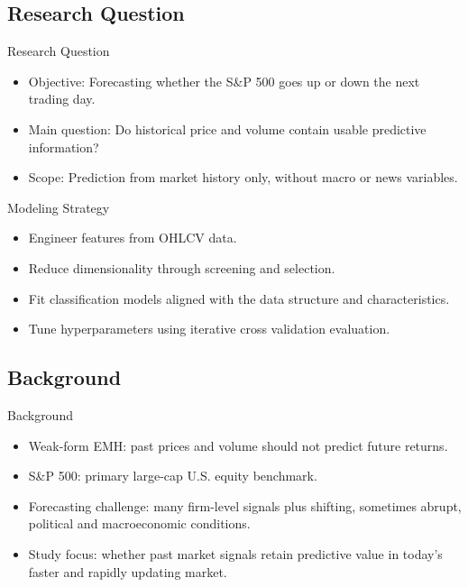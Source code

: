 \documentclass[aspectratio=169,t]{beamer} %
\begin{document}
\subsection{Research Question}
\begin{frame}{Research Question}
\begin{itemize}
  \item Objective: Forecasting whether the S\&P 500 goes up or down the next trading day.
  \item Main question: Do historical price and volume contain usable predictive information?
  \item Scope: Prediction from market history only, without macro or news variables.
\end{itemize}
\end{frame}
\begin{frame}{Modeling Strategy}
\begin{itemize}
  \item Engineer features from OHLCV data.
  \item Reduce dimensionality through screening and selection.
  \item Fit classification models aligned with the data structure and characteristics.
  \item Tune hyperparameters using iterative cross validation evaluation.
\end{itemize}
\end{frame}


\subsection{Background}
\begin{frame}{Background}
\begin{itemize}
  \item Weak-form EMH: past prices and volume should not predict future returns.
  \item S\&P 500: primary large-cap U.S. equity benchmark.
  \item Forecasting challenge: many firm-level signals plus shifting, sometimes abrupt, political and macroeconomic conditions.
  \item Study focus: whether past market signals retain predictive value in today’s faster and rapidly updating market.
\end{itemize}
\end{frame}
\end{document}
